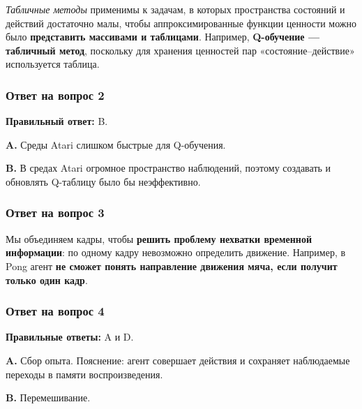 \documentclass[11pt,a4paper]{article}
\begin{document}
\emph{Табличные методы} применимы к задачам, в которых пространства состояний и действий достаточно малы, чтобы аппроксимированные функции ценности можно было \textbf{представить массивами и таблицами}. Например, \textbf{Q-обучение --- табличный метод}, поскольку для хранения ценностей пар «состояние--действие» используется таблица.

\subsubsection{Ответ на вопрос 2}\label{q2-solution}

\textbf{Правильный ответ:} B.

\textbf{A.} Среды Atari слишком быстрые для Q-обучения.

\textbf{B.} В средах Atari огромное пространство наблюдений, поэтому создавать и обновлять Q-таблицу было бы неэффективно.

\subsubsection{Ответ на вопрос 3}\label{q3-solution}

Мы объединяем кадры, чтобы \textbf{решить проблему нехватки временной информации}: по одному кадру невозможно определить движение. Например, в Pong агент \textbf{не сможет понять направление движения мяча, если получит только один кадр}.



\subsubsection{Ответ на вопрос 4}\label{q4-solution}

\textbf{Правильные ответы:} A и D.

\textbf{A.} Сбор опыта. Пояснение: агент совершает действия и сохраняет наблюдаемые переходы в памяти воспроизведения.

\textbf{B.} Перемешивание.
\end{document}

